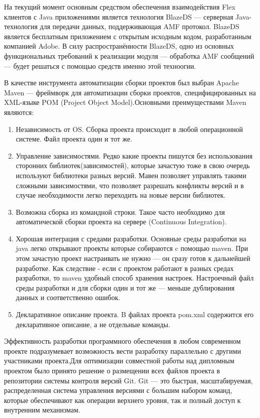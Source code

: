 На текущий момент основным средством обеспечения взаимодействия Flex клиентов с Java приложениями является технология
BlazeDS --- серверная Java-технология для передачи данных, поддерживающая AMF протокол. BlazeDS является бесплатным
приложением с открытым исходным кодом, разработанным компанией Adobe. В силу распространённости BlazeDS, одно из основных
функциональных требований к реализации модуля --- обработка AMF сообщений --- будет решаться с помощью средств именно
этой техноогии.

В качестве инструмента автоматизации сборки проектов был выбран Apache Maven --- фреймворк для автоматизации сборки
проектов, специфицированных на XML-языке POM (Project Object Model).Основными преимуществами Maven являются:

\begin{enumerate}
\item Независимость от OS. Сборка проекта происходит в любой операционной системе. Файл проекта один и тот же.
\item Управление зависимостями. Редко какие проекты пишутся без использования сторонних библиотек(зависимостей), которые
 зачастую тоже в свою очередь используют библиотеки разных версий. Мавен позволяет управлять такими сложными
 зависимостями, что позволяет разрешать конфликты версий и в случае необходимости легко переходить на новые версии
 библиотек.
\item Возможна сборка из командной строки. Такое часто необходимо для автоматической сборки проекта на сервере
(Continuous Integration).
\item Хорошая интеграция с средами разработки. Основные среды разработки на java легко открывают проекты которые
собираются c помощью maven. При этом зачастую проект настраивать не нужно --- он сразу готов к дальнейшей разработке.
Как следствие - если с проектом работают в разных средах разработки, то maven удобный способ хранения настроек.
Настроечный файл среды разработки и для сборки один и тот же --- меньше дублирования данных и соответственно ошибок.
\item Декларативное описание проекта. B файлах проекта pom.xml содержится его декларативное описание, а не отдельные
команды.
\end{enumerate}

Эффективность разработки программного обеспечения в любом современном проекте подразумевает возможность вести
разработку параллельно с другими участниками проекта.Для оптимизации совместной работы над дипломным проектом было
принято решение о размещении всех файлов проекта в репозитории системы контроля версий Git. Git --- это быстрая,
масштабируемая, распределенная система управления версиями с большим набором команд, которые обеспечивают как
операции верхнего уровня, так и полный доступ к внутренним механизмам.

